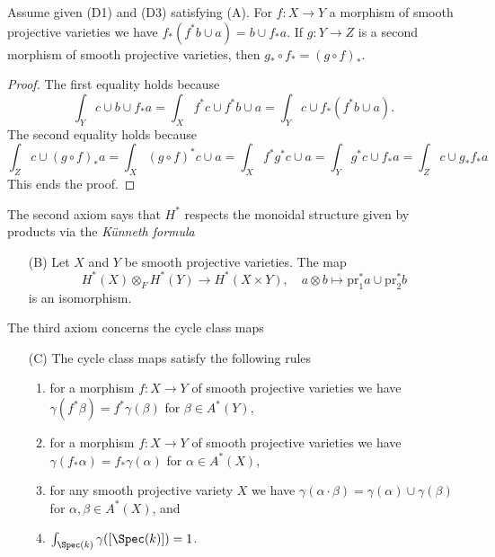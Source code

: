 \begin{lemma}
\label{lemma-pushforward-classical}
Assume given (D1) and (D3) satisfying (A). For $f : X \to Y$
a morphism of smooth projective varieties we have
$f_*(f^*b \cup a) = b \cup f_*a$. If $g : Y \to Z$ is a second morphism
of smooth projective varieties, then $g_* \circ f_* = (g \circ f)_*$.
\end{lemma}

\begin{proof}
The first equality holds because
$$
\int_Y c \cup b \cup f_*a =
\int_X f^*c \cup f^*b \cup a =
\int_Y c \cup f_*(f^*b \cup a).
$$
The second equality holds because
$$
\int_Z c \cup (g \circ f)_*a = \int_X (g \circ f)^*c \cup a =
\int_X f^* g^* c \cup a = \int_Y g^*c \cup f_*a = \int_Z c \cup g_*f_*a
$$
This ends the proof.
\end{proof}

\noindent
The second axiom says that $H^*$ respects the monoidal structure
given by products via the {\it K\"unneth formula}
\begin{enumerate}
\item[(B)] Let $X$ and $Y$ be smooth projective varieties. The map
$$
H^*(X) \otimes_F H^*(Y) \to H^*(X \times Y),\quad
a \otimes b \mapsto \text{pr}_1^*a \cup \text{pr}_2^*b
$$
is an isomorphism.
\end{enumerate}

\medskip\noindent
The third axiom concerns the cycle class maps
\begin{enumerate}
\item[(C)] The cycle class maps satisfy the following rules
\begin{enumerate}
\item for a morphism $f : X \to Y$ of smooth projective varieties
we have $\gamma(f^*\beta) = f^*\gamma(\beta)$ for $\beta \in A^*(Y)$,
\item for a morphism $f : X \to Y$ of smooth projective varieties we have
$\gamma(f_*\alpha) = f_*\gamma(\alpha)$ for $\alpha \in A^*(X)$,
\item for any smooth projective variety $X$ we have
$\gamma(\alpha \cdot \beta) = \gamma(\alpha) \cup \gamma(\beta)$
for $\alpha, \beta \in A^*(X)$, and
\item $\int_{\Spec(k)} \gamma([\Spec(k)]) = 1$.
\end{enumerate}
\end{enumerate}

